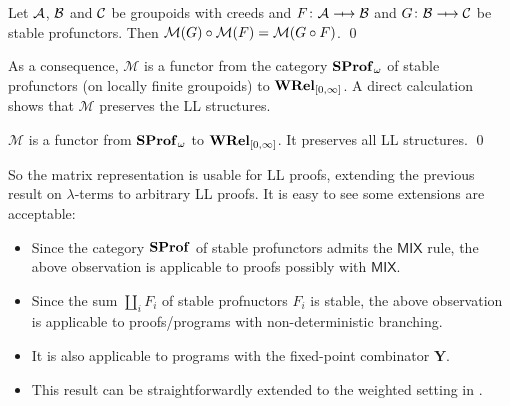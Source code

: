 \begin{corollary}
    Let \( \mathcal{A} \), \( \mathcal{B} \) and \( \mathcal{C} \) be groupoids with creeds and \( F \colon \creed \profarrow \creedb \) and \( G \colon \creedb \profarrow \creedc \) be stable profunctors.
    Then \( \mathcal{M}({G}) \circ \mathcal{M}({F}) = \mathcal{M}({G \circ F}) \).
    \qed
\end{corollary}

As a consequence, \( \mathcal{M} \) is a functor from the category \( \mathbf{SProf}_{\omega} \) of stable profunctors (on locally finite groupoids) to \( \mathbf{WRel}_{[0,\infty]} \).
A direct calculation shows that \( \mathcal{M} \) preserves the LL structures.
\begin{theorem}
    \( \mathcal{M} \) is a functor from \( \mathbf{SProf}_{\omega} \) to \( \mathbf{WRel}_{[0,\infty]} \).
    It preserves all LL structures.
    \qed
\end{theorem}
So the matrix representation is usable for LL proofs, extending the previous result on \( \lambda \)-terms to arbitrary LL proofs.
It is easy to see some extensions are acceptable:
\begin{itemize}
    \item Since the category \( \mathbf{SProf} \) of stable profunctors admits the \( \mathsf{MIX} \) rule, the above observation is applicable to proofs possibly with \( \mathsf{MIX} \).
    \item Since the sum \( \coprod_i F_i \) of stable profnuctors \( F_i \) is stable, the above observation is applicable to proofs/programs with non-deterministic branching.
    \item It is also applicable to programs with the fixed-point combinator \( \mathbf{Y} \).
    \item This result can be straightforwardly extended to the weighted setting in \cite{Tsukada2018}.
\end{itemize}



